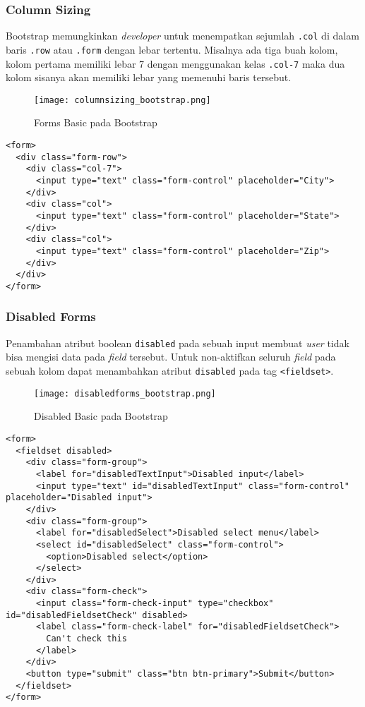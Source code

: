 \subsubsection{Column Sizing}
Bootstrap memungkinkan \textit{developer} untuk menempatkan sejumlah \texttt{.col} di dalam baris \texttt{.row} atau \texttt{.form} dengan lebar tertentu. Misalnya ada tiga buah kolom, kolom pertama memiliki lebar 7 dengan menggunakan kelas \texttt{.col-7} maka dua kolom sisanya akan memiliki lebar yang  memenuhi baris tersebut.
\begin{figure} [H]
	\centering  
	\texttt{[image: columnsizing\_bootstrap.png]}  
	\caption{Forms Basic pada Bootstrap} 
\end{figure} 
\begin{lstlisting}[frame=single] 
<form>
  <div class="form-row">
    <div class="col-7">
      <input type="text" class="form-control" placeholder="City">
    </div>
    <div class="col">
      <input type="text" class="form-control" placeholder="State">
    </div>
    <div class="col">
      <input type="text" class="form-control" placeholder="Zip">
    </div>
  </div>
</form>
\end{lstlisting}
\subsubsection{Disabled Forms}
Penambahan atribut boolean \texttt{disabled} pada sebuah input membuat \textit{user} tidak bisa mengisi data pada \textit{field} tersebut. Untuk non-aktifkan seluruh \textit{field} pada sebuah kolom dapat menambahkan atribut \texttt{disabled} pada tag \texttt{<fieldset>}.
\begin{figure} [H]
	\centering  
	\texttt{[image: disabledforms\_bootstrap.png]}  
	\caption{Disabled Basic pada Bootstrap} 
\end{figure}
\begin{lstlisting}[frame=single, basicstyle=\tiny] 
<form>
  <fieldset disabled>
    <div class="form-group">
      <label for="disabledTextInput">Disabled input</label>
      <input type="text" id="disabledTextInput" class="form-control" placeholder="Disabled input">
    </div>
    <div class="form-group">
      <label for="disabledSelect">Disabled select menu</label>
      <select id="disabledSelect" class="form-control">
        <option>Disabled select</option>
      </select>
    </div>
    <div class="form-check">
      <input class="form-check-input" type="checkbox" id="disabledFieldsetCheck" disabled>
      <label class="form-check-label" for="disabledFieldsetCheck">
        Can't check this
      </label>
    </div>
    <button type="submit" class="btn btn-primary">Submit</button>
  </fieldset>
</form>
\end{lstlisting}
